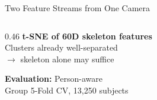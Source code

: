 \documentclass[aspectratio=169]{beamer}
\begin{document}
\begin{frame}{Two Feature Streams from One Camera}
\begin{columns}[c]
\begin{column}{0.46\textwidth}
    \vspace{0.2em}
    {\scriptsize \textbf{t-SNE of 60D skeleton features}\\Clusters already well-separated\\$\to$ skeleton alone may suffice}

    \vspace{0.5em}
    {\scriptsize \textbf{Evaluation:} Person-aware\\Group 5-Fold CV, 13,250 subjects}
\end{column}
\end{columns}
\end{frame}


\end{document}
